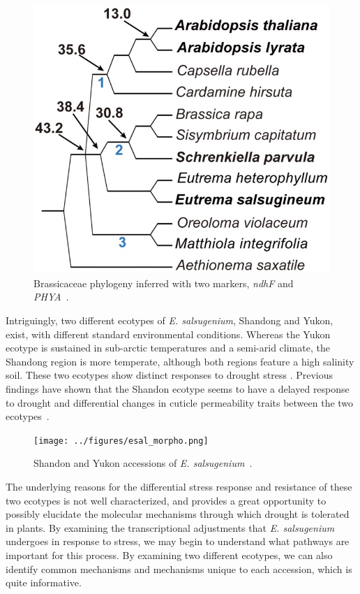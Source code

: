 \documentclass[12pt]{article}
\newcommand{\esal}{\textit{E. salsugenium}}
\begin{document}
		\begin{figure}[H]
			\centering
			\includegraphics[scale=2]{../figures/esal_phylo.jpg}
			\caption[Brassicaceae Phylogeny]{Brassicaceae phylogeny inferred with two markers, \textit{ndhF} and \textit{PHYA}~\cite{yang2013reference}.}
			\label{phylo}
		\end{figure}
		
	Intriguingly, two different ecotypes of \esal{}, Shandong and Yukon, exist, with different standard environmental conditions. Whereas the Yukon ecotype is sustained in sub-arctic temperatures and a semi-arid climate, the Shandong region is more temperate, although both regions feature a high salinity soil. These two ecotypes show distinct responses to drought stress \cite{xu2014leaf}. Previous findings have shown that the Shandon ecotype seems to have a delayed response to drought and differential changes in cuticle permeability traits between the two ecotypes~\cite{macleod2015exposure}. 
	
		\begin{figure}[H]
			\centering
			\texttt{[image: ../figures/esal\_morpho.png]}
			\caption[Shandong and Yukon ecotype morphology]{Shandon and Yukon accessions of \esal{}~\cite{macleod2015exposure}.}
			\label{morpho}
		\end{figure}
		
	The underlying reasons for the differential stress response and resistance of these two ecotypes is not well characterized, and provides a great opportunity to possibly elucidate the molecular mechanisms through which drought is tolerated in plants. By examining the transcriptional adjustments that \esal{} undergoes in response to stress, we may begin to understand what pathways are important for this process. By examining two different ecotypes, we can also identify common mechanisms and mechanisms unique to each accession, which is quite informative. 
	
\end{document}
